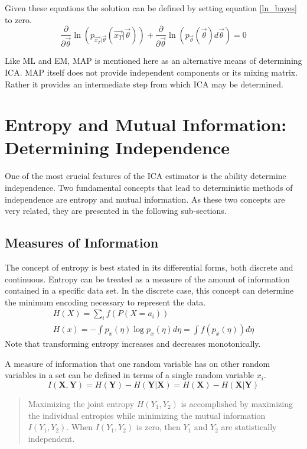 \documentclass[11pt]{article}
\begin{document}
Given these equations the solution can be defined by setting equation \ref{ln_bayes} to zero.
\begin{equation}
 \frac{\partial} {\partial \vec{\theta} } \ln( p_{\vec{x_T} | \vec{\theta}}(\vec{x_T} | \vec{\theta})) + \frac{\partial} {\partial \vec{\theta} } \ln (p_{\vec{\theta}} (\vec{\theta}) d\vec{\theta} ) = 0 
\end{equation}

Like ML and EM, MAP is mentioned here as an alternative means of determining ICA.   MAP itself does not provide independent components or its mixing matrix.  Rather it provides an intermediate step from which ICA may be determined.   

\section{Entropy and Mutual Information: Determining Independence}\label{entropy}
One of the most crucial features of the ICA estimator is the ability determine independence.  Two fundamental concepts that lead to deterministic methods of independence are entropy and mutual information.  As these two concepts are very related, they are presented in the following sub-sections.

\subsection{Measures of Information}
The concept of entropy is best stated in its differential forms, both discrete and continuous.  Entropy can be treated as a measure of the amount of information contained in a specific data set.  In the discrete case, this concept can determine the minimum encoding necessary to represent the data.
\begin{eqnarray}
H(X) = \sum_i f(P(X =a_i)) \\
H(x) = - \int p_x (\eta) \log p_x (\eta) d\eta = \int f(p_x(\eta))d\eta
\end{eqnarray}
Note that transforming entropy increases and decreases monotonically. 

A measure of information that one random variable has on other random variables in a set can be defined in terms of a single random variable $x_i$.  
\begin{equation}
I(\mathbf{X},\mathbf{Y})  = H(\mathbf{Y}) - H(\mathbf{Y}|\mathbf{X}) = H(\mathbf{X}) - H(\mathbf{X}|\mathbf{Y})
\end{equation}
\begin{quote}
Maximizing the joint entropy $H(Y_1, Y_2)$ is accomplished by maximizing the individual entropies while minimizing the mutual information $I(Y_1, Y_2)$.  When $I(Y_1, Y_2)$ is zero, then $Y_1$ and $Y_2$ are statistically independent.
\cite[662]{moon-stirling-book}
\end{quote}
\end{document}
